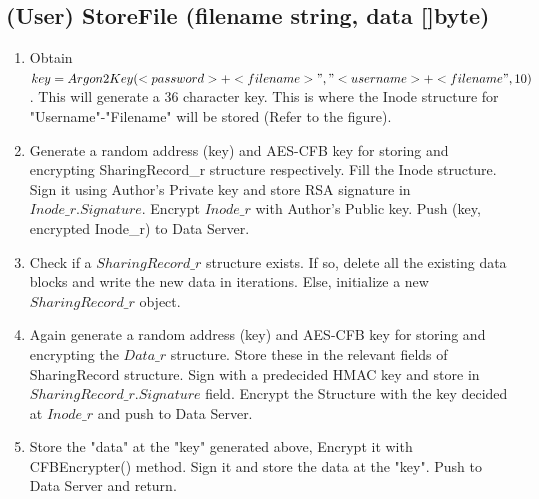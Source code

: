 \documentclass[a4paper, 12pt]{scrartcl}
\begin{document}
\subsection{(User) StoreFile (filename string, data []byte)}
\begin{enumerate}
	\itemsep0em
	\item Obtain $key = Argon2Key(<password>+<filename>", "<username>+<filename", 10)$. This will generate a 36 character key. This is where the Inode structure for "Username"-"Filename" will be stored (Refer to the figure).
	\item Generate a random address (key) and AES-CFB key for storing and encrypting SharingRecord\_r structure respectively. Fill the Inode structure. Sign it using Author's Private key and store RSA signature in $Inode\_r.Signature$. Encrypt $Inode\_r$ with Author's Public key. Push (key, encrypted Inode\_r) to Data Server.
	\item Check if a $SharingRecord\_r$ structure exists. If so, delete all the existing data blocks and write the new data in iterations. Else, initialize a new $SharingRecord\_r$ object.
	\item Again generate a random address (key) and AES-CFB key for storing and encrypting the $Data\_r$ structure. Store these in the relevant fields of SharingRecord structure. Sign with a predecided HMAC key and store in $SharingRecord\_r.Signature$ field. Encrypt the Structure with the key decided at $Inode\_r$ and push to Data Server.
	\item Store the "data" at the "key" generated above, Encrypt it with CFBEncrypter() method. Sign it and store the data at the "key". Push to Data Server and return. 
\end{enumerate}
\end{document}
